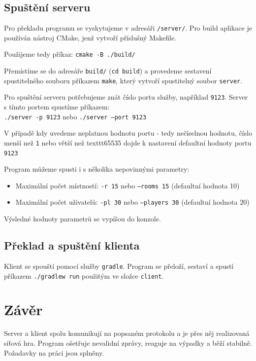 \documentclass[12pt, a4paper]{article} %
\begin{document}
	\subsection{Spuštění serveru}
	\par Pro překladu programu se vyskytujeme v adresáři \texttt{/server/}. Pro build aplikace je používán nástroj CMake, jenž vytvoří příslušný Makefile.\\
	\par Použijeme tedy příkaz: \texttt{cmake -B ./build/}\\
	\par Přemístíme se do adresáře \texttt{build/} (\texttt{cd build}) a provedeme sestavení spustitelného souboru příkazem \texttt{make}, který vytvoří spustitelný soubor \texttt{server}.\\
	\par Pro spuštění serveru potřebujeme znát číslo portu služby, například \texttt{9123}. Server s tímto portem spustíme příkazem:\\
	\texttt{./server -p 9123} nebo \texttt{./server --port 9123}\\
	\par V případě kdy uvedeme neplatnou hodnotu portu - tedy nečíselnou hodnotu, číslo menší než \texttt{1} nebo větší než texttt{65535} dojde k nastavení defaultní hodnoty portu \texttt{9123}\\
	\par Program můžeme spusti i s několika nepovinnými parametry:
	\begin{itemize}
		\item Maximální počet místností: \texttt{-r 15} nebo \texttt{--rooms 15}  (defaultní hodnota 10)
		\item Maximální počet uživatelů: \texttt{-pl 30} nebo \texttt{--players 30} (defaultní hodnota 20)
	\end{itemize}
	\par Výsledné hodnoty parametrů se vypíšou do konzole.
	

	\subsection{Překlad a spuštění klienta}
	\par Klient se spouští pomocí služby \texttt{gradle}. Program se přeloží, sestaví a spustí příkazem \texttt{./gradlew run} použitým ve složce \texttt{client}.
	\section{Závěr}
	\par Server a klient spolu komunikují na popsaném protokolu a je přes něj realizovaná síťová hra. Program ošetřuje nevalidní zprávy, reaguje na výpadky a běží stabilně. Požadavky na práci jsou splněny.
	
\end{document}
